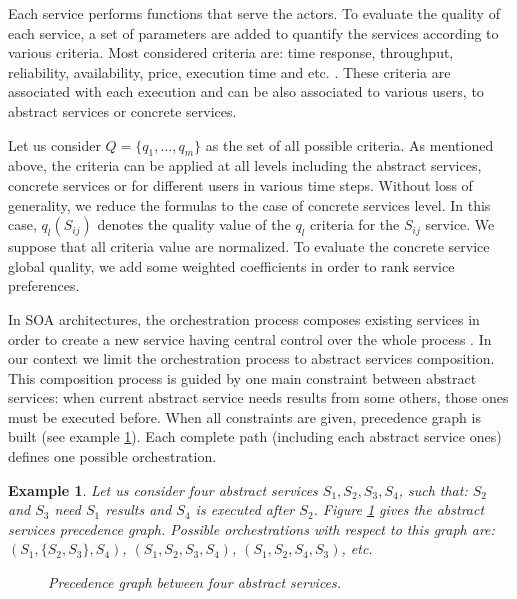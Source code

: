 \documentclass[10pt,journal,compsoc]{IEEEtran}
\newtheorem{example}{Example}
\begin{document}
Each service performs functions that serve the actors. To evaluate the quality of each service, a set of parameters are added to quantify the services according to various criteria. Most considered criteria are: time response,  throughput, reliability, availability, price, execution time and etc. \cite{Alrifai2010}. These criteria are associated with each execution and can be also associated to various users, to abstract services or concrete services. 

Let us consider $Q=\{q_1,\dots, q_m\}$ as the set of all possible criteria. As mentioned above, the criteria can be applied at all levels including the abstract services, concrete services or for different users  in various time steps. Without loss of generality, we reduce the formulas to the case of concrete services level. In this case, $q_l(S_{ij})$ denotes the quality value of the $q_l$ criteria for the $S_{ij}$ service. We suppose that all criteria value are normalized. To evaluate the concrete service global quality, we add some weighted coefficients in order to rank service preferences.

 In SOA architectures, the orchestration process composes existing services in order to create a new service having central control over the whole process\cite{http://www.soa-in-practice.com/soa-glossary.html} .  In our context we limit the orchestration process to abstract services composition. %
This composition process is guided by one main constraint between abstract services: when current abstract service needs results from some others, those ones must be executed before. When all constraints are given, precedence graph is built (see example \ref{exemple1}). Each complete path (including each abstract service ones) defines one possible orchestration. 
\begin{example} 
\label{exemple1}
Let us consider four abstract services $S_1,S_2,S_3,S_4$, such that: $S_2$ and $S_3$ need $S_1$ results and $S_4$ is executed after $S_2$. Figure \ref{exemple1} gives the abstract services precedence graph. Possible orchestrations with respect to this graph are: $(S_1,\{S_2,S_3\},S_4)$, $(S_1,S_2,S_3,S_4)$, $(S_1,S_2,S_4,S_3)$, etc. 
%
\begin{figure}[htpb]
\label{figureOrchestration}
\centering {}
\caption{ Precedence graph between four abstract services. }
\end{figure}
\end{example}
\end{document}
